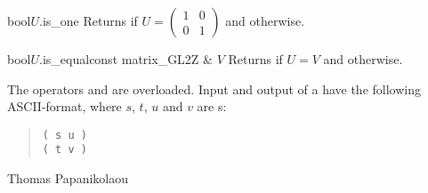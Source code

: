 \begin{cfcode}{bool}{$U$.is_one}{}
  Returns \TRUE if $U = \begin{pmatrix} 1 & 0 \\ 0 & 1 \end{pmatrix}$ and \FALSE otherwise.
\end{cfcode}

\begin{cfcode}{bool}{$U$.is_equal}{const matrix_GL2Z & $V$}
  Returns \TRUE if $U = V$ and \FALSE otherwise.
\end{cfcode}



\IO

The operators \code{<<} and \code{>>} are overloaded.  Input and output of a 
have the following ASCII-format, where $s$, $t$, $u$ and $v$ are s:

\begin{quote}
\begin{verbatim}
( s u )
( t v )
\end{verbatim}
\end{quote}



\SEEALSO







\AUTHOR

Thomas Papanikolaou
